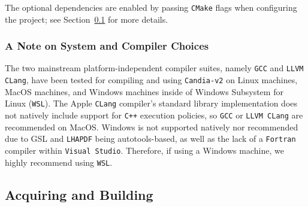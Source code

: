 \documentclass[preprint,12pt]{elsarticle}
\begin{document}
The optional dependencies are enabled by passing \texttt{CMake} flags when configuring the project; see Section~\ref{subsec:acq-and-build} for more details.

\subsubsection{A Note on System and Compiler Choices}
\label{subsubsec:compilers}

The two mainstream platform-independent compiler suites, namely \texttt{GCC} and \texttt{LLVM CLang}, have been tested for compiling and using \texttt{Candia-v2} on Linux machines, MacOS machines, and Windows machines inside of Windows Subsystem for Linux (\texttt{WSL}).
The Apple \texttt{CLang} compiler's standard library implementation does not natively include support for \texttt{C++} execution policies, so \texttt{GCC} or \texttt{LLVM CLang} are recommended on MacOS.
Windows is not supported natively nor recommended due to GSL and \texttt{LHAPDF} being autotools-based, as well as the lack of a \texttt{Fortran} compiler within \texttt{Visual Studio}.
Therefore, if using a Windows machine, we highly recommend using \texttt{WSL}.


\subsection{Acquiring and Building}
\label{subsec:acq-and-build}
\end{document}
